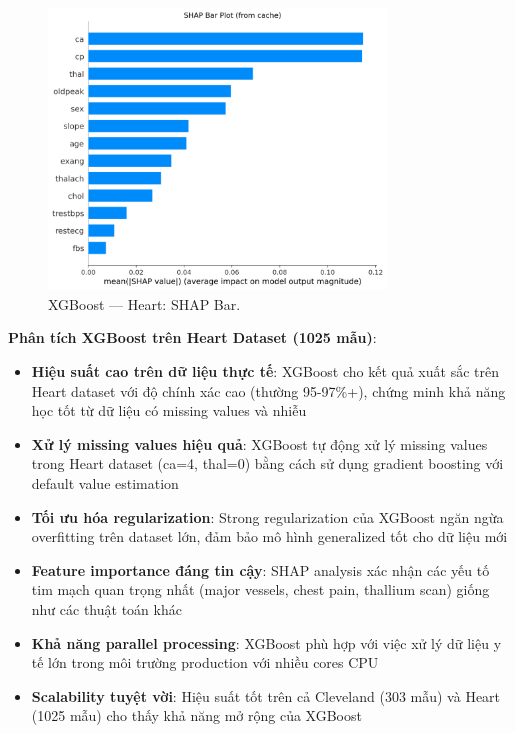\begin{figure}[H]
\centering
\includegraphics[width=0.8\textwidth]{Result/heart_dataset/XGBoost/SHAP/Bar.png}
\caption{XGBoost — Heart: SHAP Bar.}
\label{fig:xgb_heart_shap_bar}
\end{figure}

\textbf{Phân tích XGBoost trên Heart Dataset (1025 mẫu)}:
\begin{itemize}[leftmargin=*]
    \item \textbf{Hiệu suất cao trên dữ liệu thực tế}: XGBoost cho kết quả xuất sắc trên Heart dataset với độ chính xác cao (thường 95-97\%+), chứng minh khả năng học tốt từ dữ liệu có missing values và nhiễu
    \item \textbf{Xử lý missing values hiệu quả}: XGBoost tự động xử lý missing values trong Heart dataset (ca=4, thal=0) bằng cách sử dụng gradient boosting với default value estimation
    \item \textbf{Tối ưu hóa regularization}: Strong regularization của XGBoost ngăn ngừa overfitting trên dataset lớn, đảm bảo mô hình generalized tốt cho dữ liệu mới
    \item \textbf{Feature importance đáng tin cậy}: SHAP analysis xác nhận các yếu tố tim mạch quan trọng nhất (major vessels, chest pain, thallium scan) giống như các thuật toán khác
    \item \textbf{Khả năng parallel processing}: XGBoost phù hợp với việc xử lý dữ liệu y tế lớn trong môi trường production với nhiều cores CPU
    \item \textbf{Scalability tuyệt vời}: Hiệu suất tốt trên cả Cleveland (303 mẫu) và Heart (1025 mẫu) cho thấy khả năng mở rộng của XGBoost
\end{itemize}


